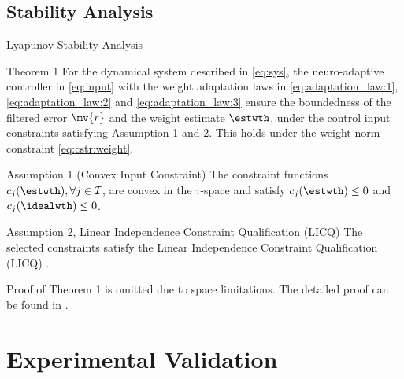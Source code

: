 \documentclass[8pt, aspectratio=169, handout]{beamer}
\begin{document}
\subsection{Stability Analysis}

\begin{frame}{\insertsubsectionhead}{Lyapunov Stability Analysis}

  \centering
  \begin{minipage}{.9\textwidth}

    \begin{block}{Theorem 1 \cite{Ryu:2025aa}}
      For the dynamical system described in \eqref{eq:sys}, the neuro-adaptive controller in \eqref{eq:input} with the weight adaptation laws in \eqref{eq:adaptation_law:1}, \eqref{eq:adaptation_law:2} and \eqref{eq:adaptation_law:3} ensure the boundedness of the filtered error $\mv{r}$ and the weight estimate $\estwth$, under the control input constraints satisfying Assumption 1 and 2. This holds under the weight norm constraint \eqref{eq:cstr:weight}.
    \end{block}

    \begin{exampleblock}{Assumption 1 (Convex Input Constraint)}
      The constraint functions $c_j(\estwth),\forall j\in\mathcal{I}$, are convex in the $\tau$-space and satisfy $c_j(\estwth)\le0$ and $c_j(\idealwth)\le0$.
    \end{exampleblock}

    \begin{exampleblock}{Assumption 2, Linear Independence Constraint Qualification (LICQ)}
      The selected constraints satisfy the Linear Independence Constraint Qualification (LICQ) \cite[Chap. 12 Def. 12.1]{Nocedal:2006aa}.
    \end{exampleblock}

  \end{minipage}

  \vspace{.2cm}

  Proof of Theorem 1 is omitted due to space limitations. The detailed proof can be found in \cite{Ryu:2025aa}.

\end{frame}

\section{Experimental Validation}
\end{document}
